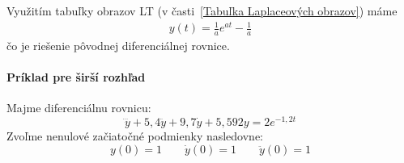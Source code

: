 \documentclass[a4paper, 10pt, ]{article}
\begin{document}
Využitím tabuľky obrazov LT (v časti~\ref{Tabuľka Laplaceových obrazov}) máme
\begin{align}
    y(t) = \frac{1}{a} e^{at} - \frac{1}{a}
\end{align}
čo je riešenie pôvodnej diferenciálnej rovnice.













\paragraph{Príklad pre širší rozhľad}

Majme diferenciálnu rovnicu:
\begin{equation} \label{Zadaná rovnica}
	\dddot{y} + 5,4 \ddot{y} + 9,7 \dot{y} + 5,592 y = 2 e^{-1,2t}
\end{equation}
Zvoľme nenulové začiatočné podmienky nasledovne:
\begin{equation*}
		y(0) = 1 \qquad \dot{y}(0)  = 1 \qquad 	\ddot{y}(0) = 1
\end{equation*}
\end{document}

